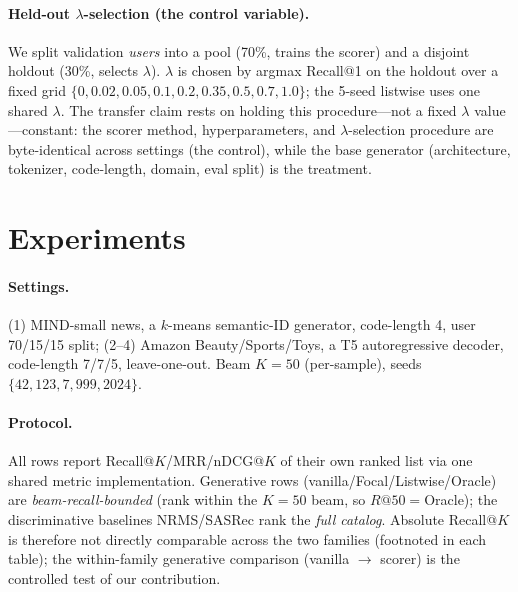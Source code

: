 \documentclass[sigconf,anonymous,review]{acmart}
\begin{document}
\paragraph{Held-out $\lambda$-selection (the control variable).} We split validation \emph{users} into
a pool (70\%, trains the scorer) and a disjoint holdout (30\%, selects $\lambda$). $\lambda$ is chosen
by argmax Recall@1 on the holdout over a fixed grid $\{0,0.02,0.05,0.1,0.2,0.35,0.5,0.7,1.0\}$; the
5-seed listwise uses one shared $\lambda$. The transfer claim rests on holding this
procedure---not a fixed $\lambda$ value---constant: the scorer method, hyperparameters, and
$\lambda$-selection procedure are byte-identical across settings (the control), while the base
generator (architecture, tokenizer, code-length, domain, eval split) is the treatment.

\section{Experiments}\label{sec:exp}
\paragraph{Settings.} (1) MIND-small news, a $k$-means semantic-ID generator, code-length 4, user
70/15/15 split; (2--4) Amazon Beauty/Sports/Toys, a T5 autoregressive decoder, code-length 7/7/5,
leave-one-out. Beam $K{=}50$ (per-sample), seeds $\{42,123,7,999,2024\}$.

\paragraph{Protocol.} All rows report Recall@$K$/MRR/nDCG@$K$ of their own ranked list via one shared
metric implementation. Generative rows (vanilla/Focal/Listwise/Oracle) are \emph{beam-recall-bounded}
(rank within the $K{=}50$ beam, so $R@50{=}$Oracle); the discriminative baselines NRMS/SASRec rank the
\emph{full catalog}. Absolute Recall@$K$ is therefore not directly comparable across the two families
(footnoted in each table); the within-family generative comparison (vanilla $\to$ scorer) is the
controlled test of our contribution.
\end{document}
